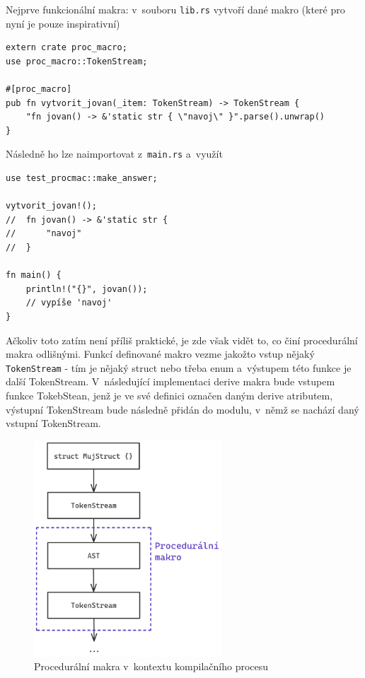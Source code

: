 \documentclass[a4paper, 12pt]{article} %
\newcommand{\rust}[1]{\texttt{#1}}
\begin{document}
            Nejprve funkcionální makra: v~souboru \texttt{lib.rs} vytvoří dané makro (které pro nyní je pouze inspirativní)
                \begin{verbatim}
extern crate proc_macro;
use proc_macro::TokenStream;

#[proc_macro]
pub fn vytvorit_jovan(_item: TokenStream) -> TokenStream {
    "fn jovan() -> &'static str { \"navoj\" }".parse().unwrap()
}
            \end{verbatim}
                
            Následně ho lze naimportovat z~\texttt{main.rs} a~využít
            \begin{verbatim}
use test_procmac::make_answer;

vytvorit_jovan!();
//  fn jovan() -> &'static str {
//      "navoj"
//  }

fn main() {
    println!("{}", jovan());
    // vypíše 'navoj'
}
            \end{verbatim}
            \cite{fcialni_proc}
                
            Ačkoliv toto zatím není příliš praktické, je zde však vidět to, co činí procedurální makra odlišnými. Funkcí definované makro vezme jakožto vstup nějaký \rust{TokenStream} - tím je nějaký struct nebo třeba enum a~výstupem této funkce je další TokenStream. V~následující implementaci derive makra bude vstupem funkce TokebStean, jenž je ve své definici označen daným derive atributem, výstupní TokenStream bude následně přidán do modulu, v~němž se nachází daný vstupní TokenStream.
            \begin{center}
                \begin{figure}[H]
                    \centering
                    \includegraphics[width=7cm]{proc}
                    \caption{Procedurální makra v~kontextu kompilačního procesu}
                    \label{fig:proc}
                \end{figure}
            \end{center}
            
\end{document}
